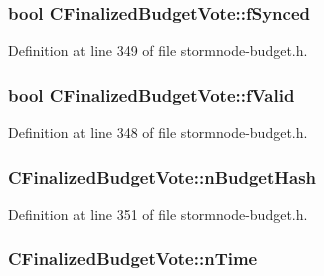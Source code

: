 \subsubsection[{f\+Synced}]{\setlength{\rightskip}{0pt plus 5cm}bool C\+Finalized\+Budget\+Vote\+::f\+Synced}\label{class_c_finalized_budget_vote_acf10705c636a83d7b1a45404a0195902}


Definition at line 349 of file stormnode-\/budget.\+h.

\hypertarget{class_c_finalized_budget_vote_aef317580b2f8a41d739e825acbdbb04a}{}
\subsubsection[{f\+Valid}]{\setlength{\rightskip}{0pt plus 5cm}bool C\+Finalized\+Budget\+Vote\+::f\+Valid}\label{class_c_finalized_budget_vote_aef317580b2f8a41d739e825acbdbb04a}


Definition at line 348 of file stormnode-\/budget.\+h.

\hypertarget{class_c_finalized_budget_vote_a2aec1fb12151d1c028e755e20f452272}{}
\subsubsection[{n\+Budget\+Hash}]{ C\+Finalized\+Budget\+Vote\+::n\+Budget\+Hash}\label{class_c_finalized_budget_vote_a2aec1fb12151d1c028e755e20f452272}


Definition at line 351 of file stormnode-\/budget.\+h.

\hypertarget{class_c_finalized_budget_vote_abe49a15e472fdaaab521ae83bb9f6e42}{}
\subsubsection[{n\+Time}]{ C\+Finalized\+Budget\+Vote\+::n\+Time}\label{class_c_finalized_budget_vote_abe49a15e472fdaaab521ae83bb9f6e42}


